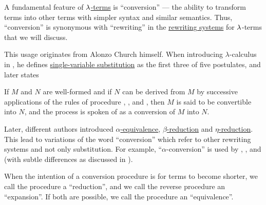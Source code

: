\begin{concept}\label{con:lambda_conversion}
  A fundamental feature of \hyperref[def:lambda_term]{\( \mathrm{\lambda} \)-terms} is \enquote{conversion} --- the ability to transform terms into other terms with simpler syntax and similar semantics. Thus, \enquote{conversion} is synonymous with \enquote{rewriting} in the \hyperref[def:rewriting_system]{rewriting systems} for \( \mathrm{\lambda} \)-terms that we will discuss.

  This usage originates from Alonzo Church himself. When introducing \( \lambda \)-calculus in \cite[357]{Church1932Untyped}, he defines \hyperref[def:lambda_substitution]{single-variable substitution} as the first three of five postulates, and later states
  \begin{displayquote}
    If \( M \) and \( N \) are well-formed and if \( N \) can be derived from \( M \) by successive applications of the rules of procedure , , and , then \( M \) is said to be convertible into \( N \), and the process is spoken of as a conversion of \( M \) into \( N \).
  \end{displayquote}

  Later, different authors introduced \hyperref[def:lambda_term_alpha_equivalence]{\( \alpha \)-equivalence}, \hyperref[def:beta_eta_reduction]{\( \beta \)-reduction} and \hyperref[def:beta_eta_reduction]{\( \eta \)-reduction}. This lead to variations of the word \enquote{conversion} which refer to other rewriting systems and not only substitution. For example, \enquote{\( \alpha \)-conversion} is used by , ,  and  (with subtle differences as discussed in ).

  When the intention of a conversion procedure is for terms to become shorter, we call the procedure a \enquote{reduction}, and we call the reverse procedure an \enquote{expansion}. If both are possible, we call the procedure an \enquote{equivalence}.
\end{concept}

